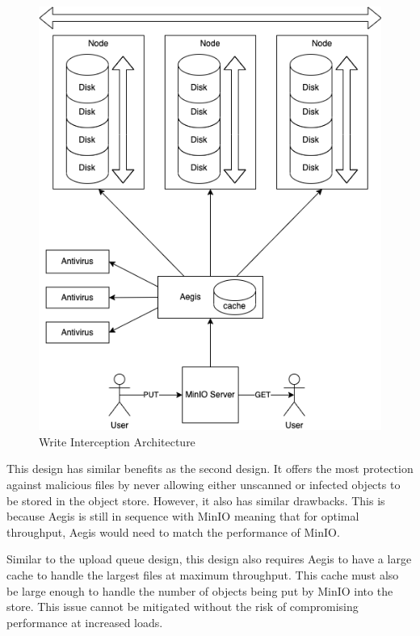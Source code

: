 \documentclass[12pt, conference, final, a4paper, onecolumn, compsoc]{IEEEtran}
\begin{document}
    \begin{figure}
        \centering \includegraphics[scale=.3]{diagrams/write-intercept.png}
        \caption{Write Interception Architecture}
        \label{fig:writeInterceptArch}
    \end{figure}

    This design has similar benefits as the second design. It
    offers the most protection against malicious files by never allowing either
    unscanned or infected objects to be stored in the object store. However, it
    also has similar drawbacks. This is because Aegis is still in sequence with
    MinIO meaning that for optimal throughput, Aegis would need to match the
    performance of MinIO.

    Similar to the upload queue design, this design also requires Aegis to have a
    large cache to handle the largest files at maximum throughput. This cache
    must also be large enough to handle the number of objects being put by MinIO
    into the store. This issue cannot be mitigated without the risk of
    compromising performance at increased loads.
\end{document}
